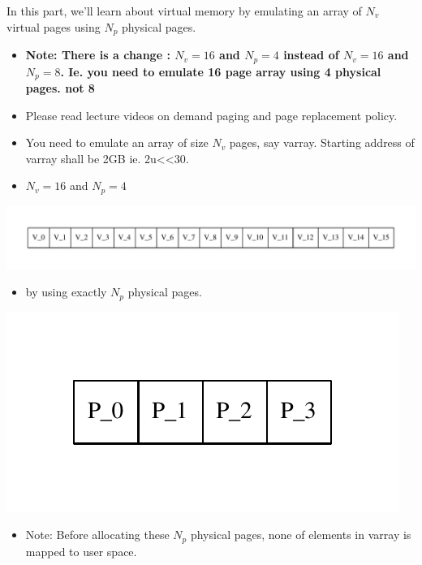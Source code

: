 \documentclass[]{article}
\providecommand{\tightlist}{%
  \setlength{\itemsep}{0pt}\setlength{\parskip}{0pt}}
\begin{document}
In this part, we'll learn about virtual memory by emulating an array of
\(N_v\) virtual pages using \(N_p\) physical pages.

\begin{itemize}
\item
  \textbf{Note: There is a change : \(N_v=16\) and \(N_p=4\) instead of
  \(N_v=16\) and \(N_p=8\). Ie. you need to emulate 16 page array using
  4 physical pages. not 8}
\item
  Please read lecture videos on demand paging and page replacement
  policy.
\item
  You need to emulate an array of size \(N_v\) pages, say varray.
  Starting address of varray shall be 2GB ie.
  2u\textless{}\textless{}30.
\item
  \(N_v=16\) and \(N_p=4\)
\end{itemize}

\includegraphics{graphviz-images/2623b6fa1d58130a3904de5d38846fcc56312f9d.pdf}

\begin{itemize}
\tightlist
\item
  by using exactly \(N_p\) physical pages.
\end{itemize}

\includegraphics{graphviz-images/a0f1bdeb6728d1f45ef7706fb8ab2cf34b03ad49.pdf}

\begin{itemize}
\tightlist
\item
  Note: Before allocating these \(N_p\) physical pages, none of elements
  in varray is mapped to user space.
\end{itemize}
\end{document}
